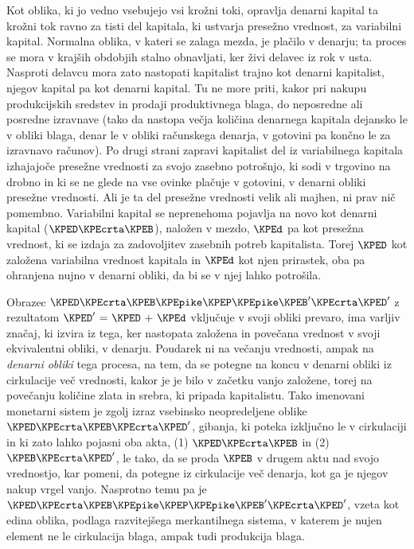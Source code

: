 \documentclass[kapital_02.tex]{subfiles}
\begin{document}
Kot oblika, ki jo vedno vsebujejo vsi krožni toki, opravlja denarni kapital ta krožni tok ravno za tisti del kapitala, ki ustvarja presežno vrednost, za variabilni kapital. Normalna oblika, v kateri se zalaga mezda, je plačilo v denarju; ta proces se mora v krajših obdobjih stalno obnavljati, ker živi delavec iz rok v usta. Nasproti delavcu mora zato nastopati kapitalist trajno kot denarni kapitalist, njegov kapital pa kot denarni kapital. Tu ne more priti, kakor pri nakupu produkcijskih sredstev in prodaji produktivnega blaga, do neposredne ali posredne izravnave (tako da nastopa večja količina denarnega kapitala dejansko le v obliki blaga, denar le v obliki računskega denarja, v gotovini pa končno le za izravnavo računov). Po drugi strani zapravi kapitalist del iz variabilnega kapitala izhajajoče presežne vrednosti za svojo zasebno potrošnjo, ki sodi v trgovino na drobno in ki se ne glede na vse ovinke plačuje v gotovini, v denarni obliki presežne vrednosti. Ali je ta del presežne vrednosti velik ali majhen, ni prav nič pomembno. Variabilni kapital se neprenehoma pojavlja na novo kot denarni kapital (\(\KPED\KPEcrta\KPEB\)), naložen v mezdo, \(\KPEd\) pa kot presežna vrednost, ki se izdaja za zadovoljitev zasebnih potreb kapitalista. Torej \(\KPED\) kot založena variabilna vrednost kapitala in \(\KPEd\) kot njen prirastek, oba pa ohranjena nujno v denarni obliki, da bi se v njej lahko potrošila.

Obrazec \KPEstran \( \KPED \KPEcrta \KPEB \KPEpike \KPEP \KPEpike \KPEB' \KPEcrta \KPED' \) z rezultatom \( \KPED' \textrm{ = } \KPED \textrm{ + } \KPEd \) vključuje v svoji obliki prevaro, ima varljiv značaj, ki izvira iz tega, ker nastopata založena in povečana vrednost v svoji ekvivalentni obliki, v denarju. Poudarek ni na večanju vrednosti, ampak na \emph{denarni obliki} tega procesa, na tem, da se potegne na koncu v denarni obliki iz cirkulacije več vrednosti, kakor je je bilo v začetku vanjo založene, torej na povečanju količine zlata in srebra, ki pripada kapitalistu. Tako imenovani monetarni sistem je zgolj izraz vsebinsko neopredeljene oblike \( \KPED \KPEcrta \KPEB \KPEcrta \KPED' \), gibanja, ki poteka izključno le v cirkulaciji in ki zato lahko pojasni oba akta, (1) \( \KPED \KPEcrta \KPEB \) in (2) \( \KPEB \KPEcrta \KPED' \), le tako, da se proda \( \KPEB \) v drugem aktu nad svojo vrednostjo, kar pomeni, da potegne iz cirkulacije več denarja, kot ga je njegov nakup vrgel vanjo. Nasprotno temu pa je \( \KPED \KPEcrta \KPEB \KPEpike \KPEP \KPEpike \KPEB' \KPEcrta \KPED' \), vzeta kot edina oblika, podlaga razvitejšega merkantilnega sistema, v katerem je nujen element ne le cirkulacija blaga, ampak tudi produkcija blaga.
\end{document}
